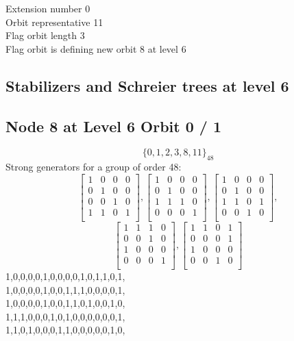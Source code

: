 \noindent Extension number 0\\
Orbit representative 11\\
Flag orbit length 3\\
Flag orbit is defining new orbit 8 at level 6\\

\subsection{Stabilizers and Schreier trees at level 6}

\subsection*{Node 8 at Level 6 Orbit 0 / 1}
$$
\{ 0, 1, 2, 3, 8, 11 \}_{48}$$
{\small\arraycolsep=2pt
Strong generators for a group of order 48:
$$
\left[
\begin{array}{*{4}{r}}
1 & 0 & 0 & 0\\
0 & 1 & 0 & 0\\
0 & 0 & 1 & 0\\
1 & 1 & 0 & 1\\
\end{array}
\right]
, 
\left[
\begin{array}{*{4}{r}}
1 & 0 & 0 & 0\\
0 & 1 & 0 & 0\\
1 & 1 & 1 & 0\\
0 & 0 & 0 & 1\\
\end{array}
\right]
, 
\left[
\begin{array}{*{4}{r}}
1 & 0 & 0 & 0\\
0 & 1 & 0 & 0\\
1 & 1 & 0 & 1\\
0 & 0 & 1 & 0\\
\end{array}
\right]
, 
$$
$$
\left[
\begin{array}{*{4}{r}}
1 & 1 & 1 & 0\\
0 & 0 & 1 & 0\\
1 & 0 & 0 & 0\\
0 & 0 & 0 & 1\\
\end{array}
\right]
, 
\left[
\begin{array}{*{4}{r}}
1 & 1 & 0 & 1\\
0 & 0 & 0 & 1\\
1 & 0 & 0 & 0\\
0 & 0 & 1 & 0\\
\end{array}
\right]
$$
1,0,0,0,0,1,0,0,0,0,1,0,1,1,0,1,\\
1,0,0,0,0,1,0,0,1,1,1,0,0,0,0,1,\\
1,0,0,0,0,1,0,0,1,1,0,1,0,0,1,0,\\
1,1,1,0,0,0,1,0,1,0,0,0,0,0,0,1,\\
1,1,0,1,0,0,0,1,1,0,0,0,0,0,1,0,\\
}
